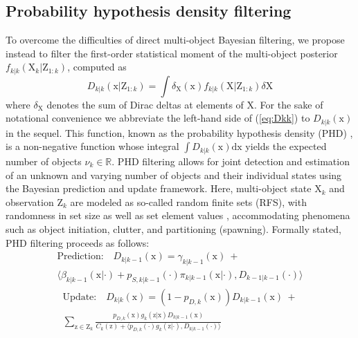 \documentclass[noinfo,nocrop,final]{bioinfo}
\begin{document}
\subsection{Probability hypothesis density filtering}\label{ssec:prob-hyp-den}
To overcome the difficulties of direct multi-object Bayesian filtering, we propose instead to filter the first-order statistical moment of the multi-object posterior $f_{k|k}(\mathrm{X}_{k}|\mathrm{Z}_{1:k})$, computed as
\begin{equation}
D_{k|k}(\mathrm{x}|\mathrm{Z}_{1:k}) = \int\!\delta_{\mathrm{X}}(\mathrm{x})f_{k|k}(\mathrm{X}|\mathrm{Z}_{1:k})\delta\mathrm{X}
\label{eq:Dkk}
\end{equation}
where $\delta_{\mathrm{X}}$ denotes the sum of Dirac deltas at elements of $\mathrm{X}$. For the sake of notational convenience we abbreviate the left-hand side of (\ref{eq:Dkk}) to $D_{k|k}(\mathrm{x})$ in the sequel. This function, known as the probability hypothesis density (PHD) \citep{mahler2003multitarget}, is a non-negative function whose integral $\int\!D_{k|k}(\mathrm{x})\mathrm{d}\mathrm{x}$ yields the expected number of objects $\nu_{k}\in\mathbb{R}$. PHD filtering allows for joint detection and estimation of an unknown and varying number of objects and their individual states using the Bayesian prediction and update framework. Here, multi-object state $\mathrm{X}_k$ and observation $\mathrm{Z}_k$ are modeled as so-called random finite sets (RFS), with randomness in set size as well as set element values \citep{bar1995multitarget}, accommodating phenomena such as object initiation, clutter, and partitioning (spawning). Formally stated, PHD filtering proceeds as follows:
\vspace{-0.5\baselineskip}
\begin{multline}
\label{eq:phd-pred}
\textrm{Prediction:}\quad D_{k|k-1}(\mathrm{x}) = \gamma_{k|k-1}(\mathrm{x})\ + \\
\langle \beta_{k|k-1}(\mathrm{x}|\cdot) + p_{S,k|k-1}(\cdot)\pi_{k|k-1}(\mathrm{x}|\cdot),D_{k-1|k-1}(\cdot) \rangle
\end{multline}
\vspace{-2\baselineskip}
\begin{multline}
\label{eq:phd-update}
\textrm{Update:}\quad D_{k|k}(\mathrm{x}) = (1-p_{D,k}(\mathrm{x})) D_{k|k-1}(\mathrm{x})\ + \\
\sum\limits_{\mathrm{z}\in\mathrm{Z}_k}\!\frac{p_{D,k}(\mathrm{x})g_k(\mathrm{z}|\mathrm{x}) D_{k|k-1}(\mathrm{x}) }{C_k(\mathrm{z})+\langle p_{D,k}(\cdot)g_k(\mathrm{z}|\cdot),D_{k|k-1}(\cdot) \rangle}
\end{multline}
\end{document}
